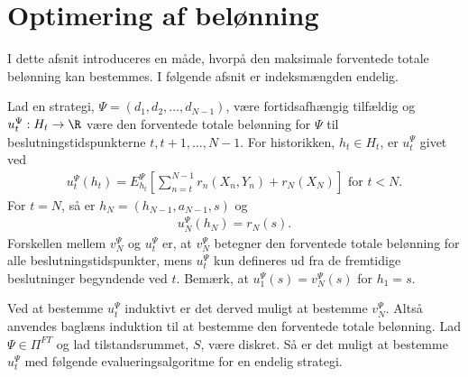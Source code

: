 \section{Optimering af belønning}
I dette afsnit introduceres en måde, hvorpå den maksimale forventede totale belønning kan bestemmes. I følgende afsnit er indeksmængden endelig. 

Lad en strategi, $\Psi = (d_1,d_2, \ldots, d_{N-1})$, være fortidsafhængig tilfældig og $u_t^\Psi: H_t \to \R$ være den forventede totale belønning for $\Psi$ til beslutningstidspunkterne $t, t+1, \ldots, N-1$. For historikken, $h_t \in H_t$, er $u_t^\Psi$ givet ved 
%
\begin{align}\label{eq:forventede_totale_belønning}
    u_t^{\Psi}(h_t)=E^{\Psi}_{h_t}\left[\sum^{N-1}_{n=t}r_n(X_n, Y_n)+r_N(X_N)\right] \text{ for } t < N.
\end{align}
For $t=N$, så er $h_N=(h_{N-1},a_{N-1},s)$ og
\begin{align}\label{eq:u_N=r_N}
    u_N^{\Psi}(h_N)=r_N(s). 
\end{align}
Forskellen mellem $v_N^\Psi$ og $u_t^\Psi$ er, at $v_N^\Psi$ betegner den forventede totale belønning for alle beslutningstidspunkter, mens $u_t^\Psi$ kun defineres ud fra de fremtidige beslutninger begyndende ved $t$. Bemærk, at $u_1^\Psi(s) = v_N^\Psi(s)$ for $h_1 = s$. 


Ved at bestemme $u_t^{\Psi}$ induktivt er det derved muligt at bestemme $v_N^\Psi$. Altså anvendes baglæns induktion til at bestemme den forventede totale belønning. 
Lad $\Psi\in \Pi^{FT}$ og lad tilstandsrummet, $S$, være diskret. Så er det muligt at bestemme $u_t^\Psi$ med følgende evalueringsalgoritme for en endelig strategi. %

